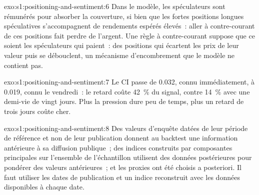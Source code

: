 \begin{solution}{exo:s1:positioning-and-sentiment:6}
Dans le modèle, les spéculateurs sont rémunérés pour absorber la couverture, si bien que les fortes positions longues spéculatives s'accompagnent de rendements espérés élevés~: aller à contre-courant de ces positions fait perdre de l'argent. Une règle à contre-courant
suppose que ce soient les spéculateurs qui paient~: des positions qui écartent les prix de leur valeur puis se débouclent, un mécanisme d'encombrement que le modèle ne contient pas.
\end{solution}

\begin{solution}{exo:s1:positioning-and-sentiment:7}
Le CI passe de 0.032, connu immédiatement, à 0.019, connu le vendredi~: le retard coûte 42~\% du signal, contre 14~\% avec une demi-vie de vingt jours. Plus
la pression dure peu de temps, plus un retard de trois jours coûte cher.
\end{solution}

\begin{solution}{exo:s1:positioning-and-sentiment:8}
Des valeurs d'enquête datées de leur période de référence et non de leur publication donnent au backtest une information antérieure à sa diffusion publique~; des indices construits
par composantes principales sur l'ensemble de l'échantillon utilisent des données postérieures pour pondérer des valeurs antérieures~; et les proxies ont été choisis a posteriori. Il faut utiliser les dates de publication
et un indice reconstruit avec les données disponibles à chaque date.
\end{solution}

